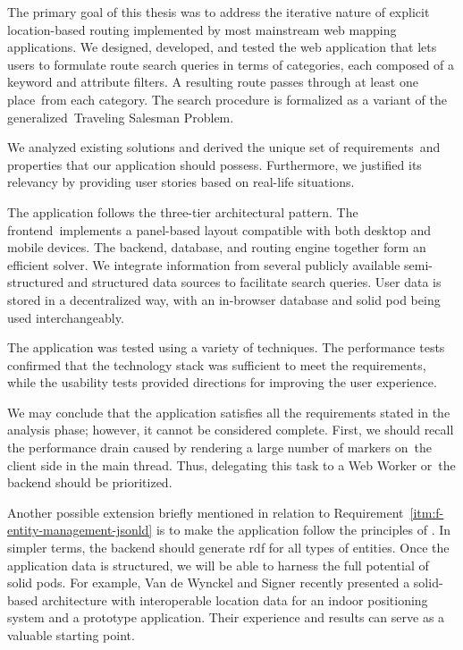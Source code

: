 \label{chap:conclusion}

The primary goal of this thesis was to address the iterative nature of explicit location-based routing implemented by most mainstream web mapping applications. We designed, developed, and tested the web application that lets users to formulate route search queries in terms of categories, each composed of a keyword and attribute filters. A resulting route passes through at least one place~from each category. The search procedure is formalized as a variant of the generalized~Traveling Salesman Problem.

We analyzed existing solutions and derived the unique set of requirements~and properties that our application should possess. Furthermore, we justified its rel\-e\-vancy by providing user stories based on real-life situations.

The application follows the three-tier architectural pattern. The frontend~im\-plements a panel-based layout compatible with both desktop and mobile devices. The backend, database, and routing engine together form an efficient solver. We integrate information from several publicly available semi-structured and structured data sources to facilitate search queries. User data is stored in a decentralized way, with an in-browser database and \acs{solid} pod being used interchangeably.

The application was tested using a variety of techniques. The performance tests confirmed that the technology stack was sufficient to meet the re\-quire\-ments, while the usability tests provided directions for improving the user experience.

We may conclude that the application satisfies all the requirements stated in the analysis phase; however, it cannot be considered complete. First, we should recall the performance drain caused by rendering a large number of markers on~the client side in the main thread. Thus, delegating this task to a Web Worker or~the backend should be prioritized.

Another possible extension briefly mentioned in relation to Requirement~\ref{itm:f-entity-management-jsonld} is to make the application follow the principles of \emph{}. In simpler terms, the backend should generate \acs{rdf} for all types of entities. Once the application data is structured, we will be able to harness the full potential of \acs{solid} pods. For example, Van de Wynckel and Signer \cite{wynckel22} recently presented a \acs{solid}-based architecture with interoperable location data for an indoor positioning system and a prototype application. Their experience and results can serve as a valuable starting point.

